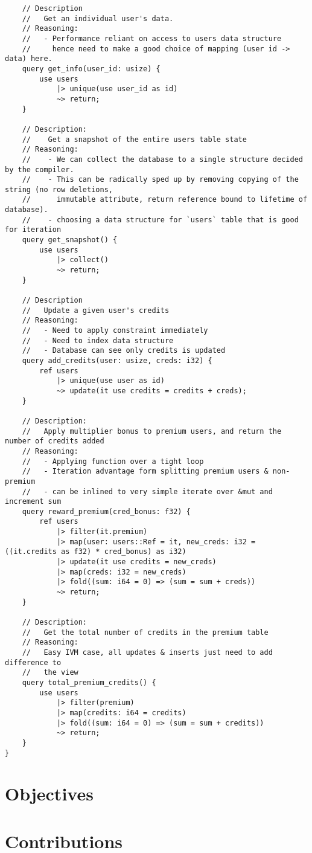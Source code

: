 \begin{verbatim}
    // Description
    //   Get an individual user's data.
    // Reasoning:
    //   - Performance reliant on access to users data structure
    //     hence need to make a good choice of mapping (user id -> data) here.
    query get_info(user_id: usize) {
        use users
            |> unique(use user_id as id)
            ~> return;
    }

    // Description:
    //    Get a snapshot of the entire users table state
    // Reasoning:
    //    - We can collect the database to a single structure decided by the compiler.
    //    - This can be radically sped up by removing copying of the string (no row deletions,
    //      immutable attribute, return reference bound to lifetime of database).
    //    - choosing a data structure for `users` table that is good for iteration
    query get_snapshot() {
        use users
            |> collect()
            ~> return;
    }

    // Description
    //   Update a given user's credits
    // Reasoning:
    //   - Need to apply constraint immediately
    //   - Need to index data structure
    //   - Database can see only credits is updated
    query add_credits(user: usize, creds: i32) {
        ref users
            |> unique(use user as id)
            ~> update(it use credits = credits + creds);
    }

    // Description:
    //   Apply multiplier bonus to premium users, and return the number of credits added
    // Reasoning:
    //   - Applying function over a tight loop
    //   - Iteration advantage form splitting premium users & non-premium
    //   - can be inlined to very simple iterate over &mut and increment sum
    query reward_premium(cred_bonus: f32) {
        ref users
            |> filter(it.premium)
            |> map(user: users::Ref = it, new_creds: i32 = ((it.credits as f32) * cred_bonus) as i32)
            |> update(it use credits = new_creds)
            |> map(creds: i32 = new_creds)
            |> fold((sum: i64 = 0) => (sum = sum + creds))
            ~> return;
    }

    // Description:
    //   Get the total number of credits in the premium table
    // Reasoning:
    //   Easy IVM case, all updates & inserts just need to add difference to
    //   the view
    query total_premium_credits() {
        use users
            |> filter(premium)
            |> map(credits: i64 = credits)
            |> fold((sum: i64 = 0) => (sum = sum + credits))
            ~> return;
    }
}    
\end{verbatim}
\section{Objectives}

\section{Contributions}
